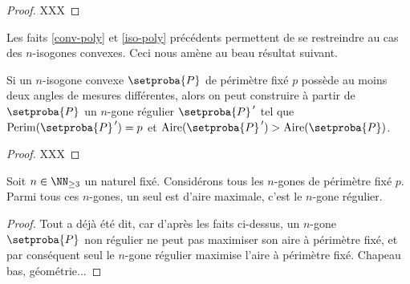 \begin{proof}
	XXX
\end{proof}




Les faits \ref{conv-poly} et \ref{iso-poly} précédents permettent de se restreindre au cas des $n$-isogones convexes. Ceci nous amène au beau résultat suivant.

\begin{fact}\label{reg-poly}
	Si un $n$-isogone convexe $\setproba{P}$ de périmètre fixé $p$ possède au moins deux angles de mesures différentes, alors on peut construire à partir de $\setproba{P}$ un $n$-gone régulier $\setproba{P}^{\,\prime}$ tel que $\perim{\setproba{P}^{\,\prime}} = p$ et $\area{\setproba{P}^{\,\prime}} > \area{\setproba{P}}$.
\end{fact}


\begin{proof}
	XXX
\end{proof}




\begin{fact}
	Soit $n \in \NN_{\geq3}$ un naturel fixé.
	Considérons tous les $n$-gones de périmètre fixé $p$. Parmi tous ces $n$-gones, un seul est d'aire maximale, c'est le $n$-gone régulier.
\end{fact}


\begin{proof}
	Tout a déjà été dit, car d'après les faits ci-dessus, un $n$-gone $\setproba{P}$ non régulier ne peut pas maximiser son aire à périmètre fixé, et par conséquent seul le $n$-gone régulier maximise l'aire à périmètre fixé. Chapeau bas, géométrie...
\end{proof}
